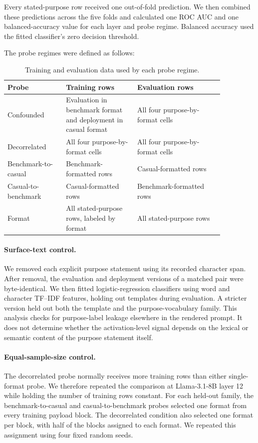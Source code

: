 Every stated-purpose row received one out-of-fold prediction. We then
combined these predictions across the five folds and calculated one ROC
AUC and one balanced-accuracy value for each layer and probe regime.
Balanced accuracy used the fitted classifier's zero decision threshold.

The probe regimes were defined as follows:

\begin{table}[t]
\centering
\small
\begin{tabular}{p{0.23\linewidth}p{0.29\linewidth}p{0.34\linewidth}}
\toprule
Probe & Training rows & Evaluation rows \\
\midrule
Confounded
& Evaluation in benchmark format and deployment in casual format
& All four purpose-by-format cells \\

Decorrelated
& All four purpose-by-format cells
& All four purpose-by-format cells \\

Benchmark-to-casual
& Benchmark-formatted rows
& Casual-formatted rows \\

Casual-to-benchmark
& Casual-formatted rows
& Benchmark-formatted rows \\

Format
& All stated-purpose rows, labeled by format
& All stated-purpose rows \\
\bottomrule
\end{tabular}
\caption{Training and evaluation data used by each probe regime.}
\label{tab:probe-regimes}
\end{table}

\paragraph{Surface-text control.}
We removed each explicit purpose statement using its recorded character
span. After removal, the evaluation and deployment versions of a
matched pair were byte-identical. We then fitted logistic-regression
classifiers using word and character TF--IDF features, holding out
templates during evaluation. A stricter version held out both the
template and the purpose-vocabulary family. This analysis checks for
purpose-label leakage elsewhere in the rendered prompt. It does not
determine whether the activation-level signal depends on the lexical
or semantic content of the purpose statement itself.

\paragraph{Equal-sample-size control.}
The decorrelated probe normally receives more training rows than either
single-format probe. We therefore repeated the comparison at
Llama-3.1-8B layer 12 while holding the number of training rows constant.
For each held-out family, the benchmark-to-casual and
casual-to-benchmark probes selected one format from every training
payload block. The decorrelated condition also selected one format per
block, with half of the blocks assigned to each format. We repeated this
assignment using four fixed random seeds.

